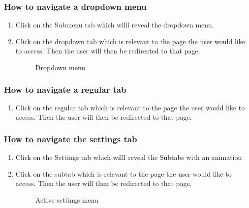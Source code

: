 \documentclass[14pt, a4paper]{article}
\begin{document}
	\subsubsection{How to navigate a dropdown menu}
		\begin{enumerate}
			\item Click on the Submenu tab which willl reveal the dropdown menu.
			\item Click on the dropdown tab which is relevant to the page the user would like to access. Then the user will then be redirected to that page.
			\begin{figure}[H]
				\centerline{}
				\caption{Dropdown menu}
  				\label{fig:navbar3}
			\end{figure}
		\end{enumerate}
	\subsubsection{How to navigate a regular tab}
		\begin{enumerate}
			\item Click on the regular tab which is relevant to the page the user would like to access. Then the user will then be redirected to that page.
		\end{enumerate}
	\subsubsection{How to navigate the settings tab}
		\begin{enumerate}
			\item Click on the Settings tab which willl reveal the Subtabs with an animation
			\item Click on the subtab which is relevant to the page the user would like to access. Then the user will then be redirected to that page.
			\begin{figure}[H]
				\centerline{}
				\caption{Active settings menu}
  				\label{fig:navbar3}
			\end{figure}
		\end{enumerate}
\end{document}
